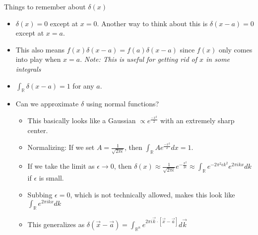 \documentclass[11pt, oneside]{article}   	%
\begin{document}
Things to remember about $\delta(x)$
\begin{itemize}
\item  $\delta(x) = 0$ except at $x=0$.  Another way to think about this is $\delta(x - a) = 0$ except at $x=a$. 
\item This also means $f(x)\delta(x-a)= f(a)\delta(x-a)$ since $f(x)$ only comes into play when $x=a$.  \emph{Note: This is useful for getting rid of $x$ in some integrals}
\item $\int_{\mathbb{R}} \delta(x-a) = 1$ for any $a$.  
\item Can we approximate $\delta$ using normal functions?

\begin{itemize}
\item This basically looks like a Gaussian $\propto e^{\frac{-x^2}{2}}$ with an extremely sharp center.
\item Normalizing: If we set $A = \frac{1}{\sqrt{2\pi \epsilon}}$, then $\int_{\mathbb{R}} Ae^{\frac{-x^2}{2}} dx = 1$.
\item If we take the limit as $\epsilon \rightarrow 0$, then $\delta(x) \approx \frac{1}{\sqrt{2 \pi \epsilon}} e^{-\frac{x^2}{2\epsilon}}
   \approx \int_{\mathbb{R}} e^{-2\pi^2\epsilon k^2}e^{2\pi i k x}dk$ if $\epsilon$ is small.
\item Subbing $\epsilon = 0$, which is not technically allowed, makes this look like $\int_{\mathbb{R}} e^{2\pi i k x } dk$
\item This generalizes as $\delta(\vec{x} - \vec{a}) = \int_{\mathbb{R}^n} e^{2\pi i \vec{k} \cdot [\vec{x} - \vec{a}] } d\vec{k}$
\end{itemize}
\end{itemize}
\end{document}
